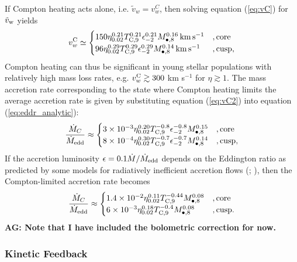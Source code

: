\documentclass[usenatbib,fleqn]{mn2e}
\begin{document}
If Compton heating acts alone, i.e. $\tilde{v}_{w} = v_{w}^{C}$, then solving equation
(\ref{eq:vC}) for $\tilde{v}_{\rm w}$ yields
\begin{align} v_{w}^{\rm C} \simeq
  \begin{cases} 150 \eta_{0.02}^{0.21}T_{\rm
C,9}^{0.21}\epsilon_{-2}^{0.21} M_{\bullet,8}^{0.16}\,{\rm km\,s^{-1}}
&, \text{core}\\ 96 \eta_{0.02}^{0.29}T_{\rm
C,9}^{0.29}\epsilon_{-2}^{0.29} M_{\bullet,8}^{0.14}\,{\rm km\,s^{-1}}
&, \text{cusp},
  \end{cases}
  \label{eq:vC2}
\end{align} 
Compton heating can thus be significant in young stellar populations with relatively high mass loss rates, e.g. $v_{w}^{\rm C} \gtrsim 300$ km s$^{-1}$ for $\eta \gtrsim 1$.  The mass accretion rate corresponding to the state where Compton heating limits the average accretion rate is given by substituting equation (\ref{eq:vC2}) into equation (\ref{eq:eddr_analytic}):
\begin{align}
\frac{\dot{M}_{C}}{\dot{M}_{\rm edd}} \approx 
\begin{cases} 3\times 10^{-3} \eta_{0.02}^{0.20}T_{\rm
C,9}^{-0.8}\epsilon_{-2}^{-0.8} M_{\bullet,8}^{0.15}
&, \text{core}\\ 8\times 10^{-4} \eta_{0.02}^{0.30}T_{\rm
C,9}^{-0.7}\epsilon_{-2}^{-0.7} M_{\bullet,8}^{0.14}
&, \text{cusp},
  \end{cases}
  \label{eq:MdotCa}
\end{align}
If the accretion luminosity $\epsilon = 0.1 \dot{M}/\dot{M}_{\rm edd}$ depends on the Eddington ratio as predicted by some models for radiatively inefficient accretion flows (\citealt{Narayan&Yi95}; \citealt{Narayan+98}), then the Compton-limited accretion rate becomes
\begin{align}
\frac{\dot{M}_{C}}{\dot{M}_{\rm edd}} \approx 
\begin{cases} 1.4\times 10^{-2} \eta_{0.02}^{0.11}T_{\rm
C,9}^{-0.44}M_{\bullet,8}^{0.08}
&, \text{core}\\ 6\times 10^{-3} \eta_{0.02}^{0.18}T_{\rm
C,9}^{-0.4} M_{\bullet,8}^{0.08}
&, \text{cusp}.
  \end{cases}
  \label{eq:MdotC}
\end{align}
{\bf AG: Note that I have included the bolometric correction for now.}


\subsubsection{Kinetic Feedback}
\end{document}
